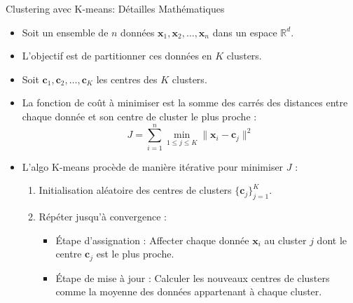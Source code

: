 \documentclass{beamer}
\begin{document}
\begin{frame}{Clustering avec K-means: Détailles Mathématiques}
\begin{itemize}
	\item Soit un ensemble de $n$ données $\mathbf{x}_1, \mathbf{x}_2, \dots, \mathbf{x}_n$ dans un espace $\mathbb{R}^d$.
	\item L'objectif est de partitionner ces données en $K$ clusters.
	\item Soit $\mathbf{c}_1, \mathbf{c}_2, \dots, \mathbf{c}_K$ les centres des $K$ clusters.
	\item La fonction de coût à minimiser est la somme des carrés des distances entre chaque donnée et son centre de cluster le plus proche :
	\begin{equation}
		J = \sum_{i=1}^n \min_{1 \leq j \leq K} \|\mathbf{x}_i - \mathbf{c}_j\|^2
	\end{equation}
	\item L'algo K-means procède de manière itérative pour minimiser $J$ :
	\begin{enumerate}
		\item Initialisation aléatoire des centres de clusters $\{\mathbf{c}_j\}_{j=1}^K$.
		\item Répéter jusqu'à convergence :
		\begin{itemize}
			\item Étape d'assignation : Affecter chaque donnée $\mathbf{x}_i$ au cluster $j$ dont le centre $\mathbf{c}_j$ est le plus proche.
			\item Étape de mise à jour : Calculer les nouveaux centres de clusters comme la moyenne des données appartenant à chaque cluster.
		\end{itemize}
	\end{enumerate}
\end{itemize}
\end{frame}
\end{document}
